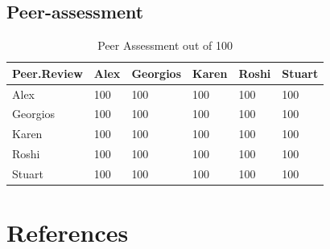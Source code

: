 \documentclass[10pt]{article}\usepackage[]{graphicx}\usepackage[]{color}
\begin{document}
\subsection{Peer-assessment}

\begin{table}[ht]
\centering
\caption{Peer Assessment out of 100} 
\label{tab:two}
\begin{tabular}{llllll}
  \hline
Peer.Review & Alex & Georgios & Karen & Roshi & Stuart \\ 
  \hline
Alex & 100 & 100 & 100 & 100 & 100 \\ 
  Georgios & 100 & 100 & 100 & 100 & 100 \\ 
  Karen & 100 & 100 & 100 & 100 & 100 \\ 
  Roshi & 100 & 100 & 100 & 100 & 100 \\ 
  Stuart & 100 & 100 & 100 & 100 & 100 \\ 
   \hline
\end{tabular}
\end{table}



\pagebreak
\section*{References}\label{pubs}
\printbibliography[heading =none]
\end{document}
